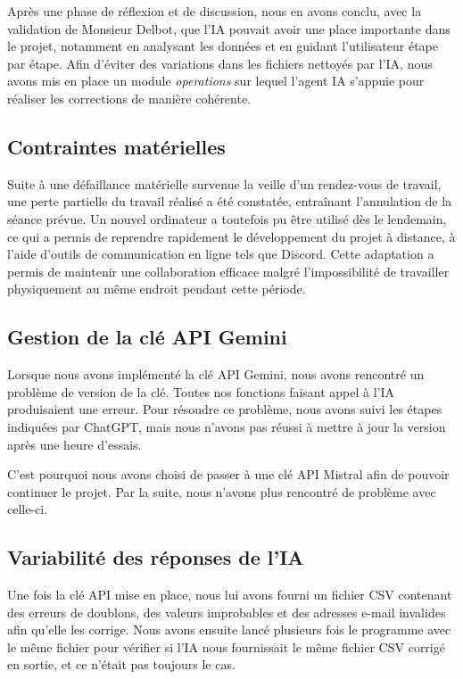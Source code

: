 \documentclass[a4paper, 12pt, twoside]{article}
\begin{document}
Après une phase de réflexion et de discussion, nous en avons conclu, avec la validation de Monsieur Delbot, que l’IA pouvait avoir une place importante dans le projet, notamment en analysant les données et en guidant l’utilisateur étape par étape. Afin d’éviter des variations dans les fichiers nettoyés par l’IA, nous avons mis en place un module \textit{operations} sur lequel l’agent IA s’appuie pour réaliser les corrections de manière cohérente.

    \subsection{Contraintes matérielles}
Suite à une défaillance matérielle survenue la veille d’un rendez-vous de travail, une perte partielle du travail réalisé a été constatée, entraînant l’annulation de la séance prévue. Un nouvel ordinateur a toutefois pu être utilisé dès le lendemain, ce qui a permis de reprendre rapidement le développement du projet à distance, à l’aide d’outils de communication en ligne tels que Discord. Cette adaptation a permis de maintenir une collaboration efficace malgré l’impossibilité de travailler physiquement au même endroit pendant cette période.

    \subsection{Gestion de la clé API Gemini}
Lorsque nous avons implémenté la clé API Gemini, nous avons rencontré un problème de version de la clé. Toutes nos fonctions faisant appel à l’IA produisaient une erreur. Pour résoudre ce problème, nous avons suivi les étapes indiquées par ChatGPT, mais nous n’avons pas réussi à mettre à jour la version après une heure d’essais.

C’est pourquoi nous avons choisi de passer à une clé API Mistral afin de pouvoir continuer le projet. Par la suite, nous n’avons plus rencontré de problème avec celle-ci.

    \subsection{Variabilité des réponses de l'IA}
Une fois la clé API mise en place, nous lui avons fourni un fichier CSV contenant des erreurs de doublons, des valeurs improbables et des adresses e-mail invalides afin qu’elle les corrige. Nous avons ensuite lancé plusieurs fois le programme avec le même fichier pour vérifier si l’IA nous fournissait le même fichier CSV corrigé en sortie, et ce n’était pas toujours le cas.
\end{document}
